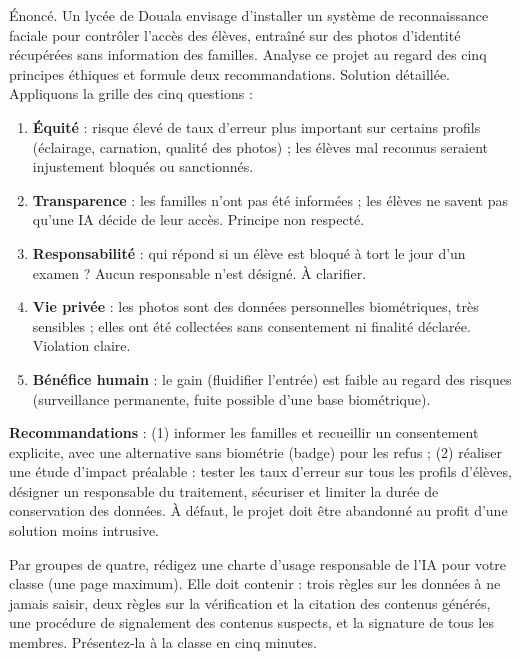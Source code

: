 \documentclass[11pt]{article}
\begin{document}
\begin{exoresolu}
Énoncé. Un lycée de Douala envisage d'installer un système de reconnaissance faciale pour contrôler l'accès des élèves, entraîné sur des photos d'identité récupérées sans information des familles. Analyse ce projet au regard des cinq principes éthiques et formule deux recommandations.
\tcblower
Solution détaillée. Appliquons la grille des cinq questions :
\begin{enumerate}
\item \textbf{Équité} : risque élevé de taux d'erreur plus important sur certains profils (éclairage, carnation, qualité des photos) ; les élèves mal reconnus seraient injustement bloqués ou sanctionnés.
\item \textbf{Transparence} : les familles n'ont pas été informées ; les élèves ne savent pas qu'une IA décide de leur accès. Principe non respecté.
\item \textbf{Responsabilité} : qui répond si un élève est bloqué à tort le jour d'un examen ? Aucun responsable n'est désigné. À clarifier.
\item \textbf{Vie privée} : les photos sont des données personnelles biométriques, très sensibles ; elles ont été collectées sans consentement ni finalité déclarée. Violation claire.
\item \textbf{Bénéfice humain} : le gain (fluidifier l'entrée) est faible au regard des risques (surveillance permanente, fuite possible d'une base biométrique).
\end{enumerate}
\textbf{Recommandations} : (1) informer les familles et recueillir un consentement explicite, avec une alternative sans biométrie (badge) pour les refus ; (2) réaliser une étude d'impact préalable : tester les taux d'erreur sur tous les profils d'élèves, désigner un responsable du traitement, sécuriser et limiter la durée de conservation des données. À défaut, le projet doit être abandonné au profit d'une solution moins intrusive.
\end{exoresolu}

\begin{exercice}
Par groupes de quatre, rédigez une charte d'usage responsable de l'IA pour votre classe (une page maximum). Elle doit contenir : trois règles sur les données à ne jamais saisir, deux règles sur la vérification et la citation des contenus générés, une procédure de signalement des contenus suspects, et la signature de tous les membres. Présentez-la à la classe en cinq minutes.
\end{exercice}
\end{document}
